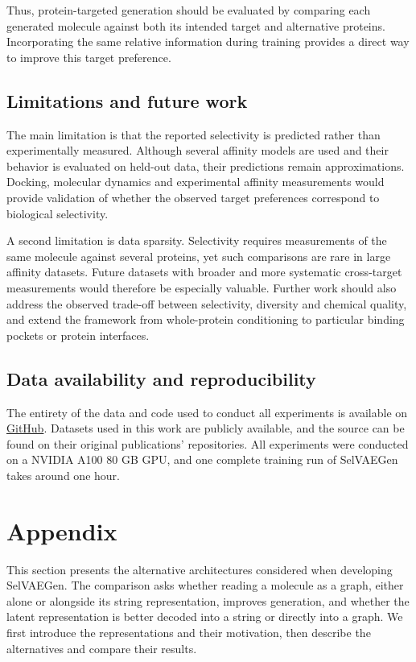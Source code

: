 \documentclass[a4paper,12pt]{article}
\begin{document}
Thus, protein-targeted generation should be evaluated by comparing each generated molecule against both its intended target and alternative proteins. Incorporating the same relative information during training provides a direct way to improve this target preference.

\subsection{Limitations and future work}\label{sec:limitations}

The main limitation is that the reported selectivity is predicted rather than experimentally measured. Although several affinity models are used and their behavior is evaluated on held-out data, their predictions remain approximations. Docking, molecular dynamics and experimental affinity measurements would provide validation of whether the observed target preferences correspond to biological selectivity.

A second limitation is data sparsity. Selectivity requires measurements of the same molecule against several proteins, yet such comparisons are rare in large affinity datasets. Future datasets with broader and more systematic cross-target measurements would therefore be especially valuable. Further work should also address the observed trade-off between selectivity, diversity and chemical quality, and extend the framework from whole-protein conditioning to particular binding pockets or protein interfaces.

\subsection{Data availability and reproducibility}
The entirety of the data and code used to conduct all experiments is available on \href{https://github.com/DutraIRS/SelVAEGen}{GitHub}. Datasets used in this work are publicly available, and the source can be found on their original publications' repositories. All experiments were conducted on a NVIDIA A100 80 GB GPU, and one complete training run of SelVAEGen takes around one hour.

\newpage
{}
{}
\section*{Appendix}
\setcounter{figure}{0}
\setcounter{table}{0}
\renewcommand{\thefigure}{S\arabic{figure}}
\renewcommand{\thetable}{S\arabic{table}}
This section presents the alternative architectures considered when developing SelVAEGen. The comparison asks whether reading a molecule as a graph, either alone or alongside its string representation, improves generation, and whether the latent representation is better decoded into a string or directly into a graph. We first introduce the representations and their motivation, then describe the alternatives and compare their results.
\end{document}
